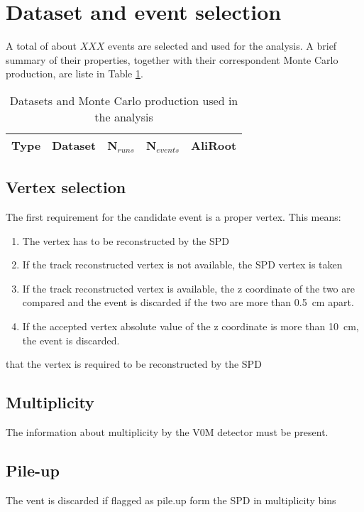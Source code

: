 \section{Dataset and event selection}
\label{sec:Dataset_and_event_selection}

A total of about $XXX$ events are selected and used for the analysis. A brief summary of their properties, together with their correspondent Monte Carlo production, are liste in Table \ref{tab:datasetsummary}. 

\begin{table}
\center
\begin{tabularx}{\textwidth}{c|cccc}
Type		&Dataset		&N$_{runs}$		&N$_{events}$		&AliRoot\\
\hline

\end{tabularx}
\caption{Datasets and Monte Carlo production used in the analysis}
\label{tab:datasetsummary}
\end{table}

\subsection{Vertex selection}
The first requirement for the candidate event is a proper vertex. This means:
\begin{enumerate}
\item The vertex has to be reconstructed by the SPD
\item If the track reconstructed vertex is not available, the SPD vertex is taken
\item If the track reconstructed vertex is available, the z coordinate of the two are compared and the event is discarded if the two are more than \SI{0.5}{\centi\meter} apart.
\item If the accepted vertex absolute value of the z coordinate is more than \SI{10}{\centi\meter}, the event is discarded.
\end{enumerate}
that the vertex is required to be reconstructed by the SPD

\subsection{Multiplicity}
The information about multiplicity by the V0M detector must be present.

\subsection{Pile-up}
The vent is discarded if flagged as pile.up form the SPD in multiplicity bins


